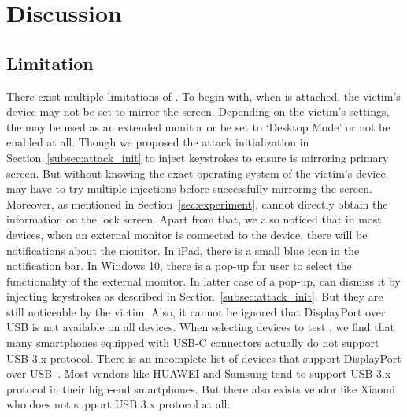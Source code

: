 \section{Discussion}
\label{sec:discussion}

\subsection{Limitation}
There exist multiple limitations of \tool. To begin with, when \tool is attached, the victim's device may not be set to mirror the screen.
Depending on the victim's settings, the \tool may be used as an extended monitor or be set to `Desktop Mode' or not be enabled at all. Though we proposed the attack initialization in Section~\ref{subsec:attack_init} to inject keystrokes to ensure \tool is mirroring primary screen. But without knowing the exact operating system of the victim's device, \tool may have to try multiple injections before successfully mirroring the screen.
Moreover, as mentioned in Section~\ref{sec:experiment}, \tool cannot directly obtain the information on the lock screen.
 Apart from that, we also noticed that in most devices, when an external monitor is connected to the device, there will be notifications about the monitor. In iPad, there is a small blue icon in the notification bar. In Windows 10, there is a pop-up for user to select the functionality of the external monitor. In latter case of a pop-up, \tool can dismiss it by injecting keystrokes as described in Section~\ref{subsec:attack_init}. But they are still noticeable by the victim. Also, it cannot be ignored that DisplayPort over \ac{USB} is not available on all devices. When selecting devices to test \tool, we find that many smartphones equipped with USB-C connectors actually do not support \ac{USB} 3.x protocol. There is an incomplete list of devices that support DisplayPort over \ac{USB}~\cite{usbclist}. Most vendors like HUAWEI and Samsung tend to support \ac{USB} 3.x protocol in their \mbox{high-end} smartphones. But there also exists vendor like Xiaomi who does not support \ac{USB} 3.x protocol at all.

\begin{comment}
There exist multiple limitations of \tool.  To begin with, \tool can only gain
the information and control access of the host itself instead of external
hardware.  Consequently, as we introduced in the
Section~\ref{sec:countermeasures}, \tool can hardly bypass the defense
approaches that use external hardware for authorization.  Moreover, most of
the devices will prompt users to give authentication to the \ac{USB} devices or
select one of the functional modes after they are plugged in.  Though some of
such prompts are not conspicuous for non-experts, especially when \tool is
concealed within other functional hardware such as power banks \shuqing{If
there is experiment, add it here.}, the probability of whether users could get
aware that something unusual happens will increase with the existence of these
prompting messages.
\end{comment}
